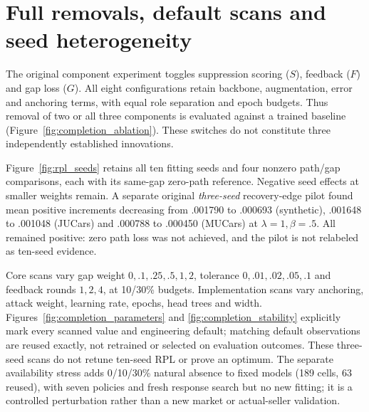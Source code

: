 \section{Full removals, default scans and seed heterogeneity}\label{app:extended}
The original component experiment toggles suppression scoring ($S$), feedback
($F$) and gap loss ($G$). All eight configurations retain backbone,
augmentation, error and anchoring terms, with equal role separation and epoch
budgets. Thus removal of two or all three components is evaluated against a
trained baseline (Figure~\ref{fig:completion_ablation}). These switches do
not constitute three independently established innovations.

Figure~\ref{fig:rpl_seeds} retains all ten fitting seeds and four nonzero
path/gap comparisons, each with its same-gap zero-path reference. Negative
seed effects at smaller weights remain. A separate original \emph{three-seed}
recovery-edge pilot found mean positive increments decreasing from .001790
to .000693 (synthetic), .001648 to .001048 (JUCars) and .000788 to .000450
(MUCars) at $\lambda=1,\beta=.5$. All remained positive: zero path loss was
not achieved, and the pilot is not relabeled as ten-seed evidence.

Core scans vary gap weight $0,.1,.25,.5,1,2$, tolerance
$0,.01,.02,.05,.1$ and feedback rounds $1,2,4$, at 10/30\% budgets.
Implementation scans vary anchoring, attack weight, learning rate, epochs,
head trees and width. Figures~\ref{fig:completion_parameters} and
\ref{fig:completion_stability} explicitly mark every scanned value and
engineering default; matching default observations are reused exactly, not
retrained or selected on evaluation outcomes. These three-seed scans do not
retune ten-seed RPL or prove an optimum. The separate availability stress
adds 0/10/30\% natural absence to fixed models (189 cells, 63 reused), with
seven policies and fresh response search but no new fitting; it is a controlled
perturbation rather than a new market or actual-seller validation.

